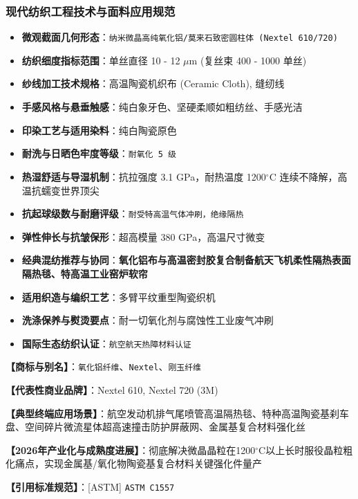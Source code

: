 \documentclass[11pt,openright,twoside,UTF8]{ctexbook}
\begin{document}
\subsubsection*{现代纺织工程技术与面料应用规范}
\begin{itemize} \setlength{\itemsep}{2pt}
    \item \textbf{微观截面几何形态}：\texttt{纳米微晶高纯氧化铝/莫来石致密圆柱体 (Nextel 610/720)}
    \item \textbf{纺织细度指标范围}：单丝直径 10 - 12 $\mu$m (复丝束 400 - 1000 单丝)
    \item \textbf{纱线加工技术规格}：高温陶瓷机织布 (Ceramic Cloth), 缝纫线
    \item \textbf{手感风格与悬垂触感}：纯白象牙色、坚硬柔顺如粗纺丝、手感光洁
    \item \textbf{印染工艺与适用染料}：纯白陶瓷原色
    \item \textbf{耐洗与日晒色牢度等级}：\texttt{耐氧化 5 级}
    \item \textbf{热湿舒适与导湿机制}：抗拉强度 3.1 GPa，耐热温度 1200$^\circ\mathrm{C}$ 连续不降解，高温抗蠕变世界顶尖
    \item \textbf{抗起球级数与耐磨评级}：\texttt{耐受特高温气体冲刷，绝缘隔热}
    \item \textbf{弹性伸长与抗皱保形}：超高模量 380 GPa，高温尺寸微变
    \item \textbf{经典混纺推荐与协同}：\textbf{氧化铝布与高温密封胶复合制备航天飞机柔性隔热表面隔热毯、特高温工业窑炉软帘}
    \item \textbf{适用织造与编织工艺}：多臂平纹重型陶瓷织机
    \item \textbf{洗涤保养与熨烫要点}：耐一切氧化剂与腐蚀性工业废气冲刷
    \item \textbf{国际生态纺织认证}：\texttt{航空航天热障材料认证}
\end{itemize}
\vspace{0.2cm}

\noindent\textbf{【商标与别名】}：\texttt{氧化铝纤维}、\texttt{Nextel}、\texttt{刚玉纤维}\par
\noindent\textbf{【代表性商业品牌】}：Nextel 610, Nextel 720 (3M)\par
\noindent\textbf{【典型终端应用场景】}：航空发动机排气尾喷管高温隔热毯、特种高温陶瓷基刹车盘、空间碎片微流星体超高速撞击防护屏蔽网、金属基复合材料强化丝\par
\noindent\textbf{【2026年产业化与成熟度进展】}：彻底解决微晶晶粒在1200$^\circ\mathrm{C}$以上长时服役晶粒粗化痛点，实现金属基/氧化物陶瓷基复合材料关键强化件量产\par
\noindent\textbf{【引用标准规范】}：[ASTM] \texttt{ASTM C1557}\par
\vspace{0.5cm}
\end{document}
